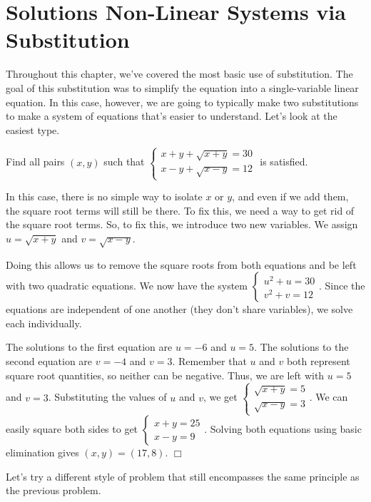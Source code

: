 \documentclass[../book.tex]{subfiles}
\begin{document}
\section{Solutions Non-Linear Systems via Substitution}
\noindent Throughout this chapter, we've covered the most basic use of substitution.  The goal of this substitution was to simplify the equation into a single-variable linear equation.  In this case, however, we are going to typically make two substitutions to make a system of equations that's easier to understand.  Let's look at the easiest type.
\begin{example}
Find all pairs $(x,y)$ such that $\begin{cases} x+y+\sqrt{x+y}=30 \\ x-y+\sqrt{x-y}=12 \end{cases}$ is satisfied.
\end{example}
\begin{solution}
In this case, there is no simple way to isolate $x$ or $y$, and even if we add them, the square root terms will still be there.  To fix this, we need a way to get rid of the square root terms.  So, to fix this, we introduce two new variables.  We assign $u=\sqrt{x+y}$ and $v=\sqrt{x-y}$.

Doing this allows us to remove the square roots from both equations and be left with two quadratic equations.  We now have the system $\begin{cases} u^2+u=30 \\ v^2+v=12 \end{cases}$.  Since the equations are independent of one another (they don't share variables), we solve each individually.

The solutions to the first equation are $u=-6$ and $u=5$.  The solutions to the second equation are $v=-4$ and $v=3$.  Remember that $u$ and $v$ both represent square root quantities, so neither can be negative.  Thus, we are left with $u=5$ and $v=3$.  Substituting the values of $u$ and $v$, we get $\begin{cases} \sqrt{x+y}=5 \\ \sqrt{x-y}=3 \end{cases}$.  We can easily square both sides to get $\begin{cases} x+y=25 \\ x-y=9 \end{cases}$.  Solving both equations using basic elimination gives $(x,y)=(17,8)$.  $\Box$
\end{solution}
Let's try a different style of problem that still encompasses the same principle as the previous problem.
\end{document}
